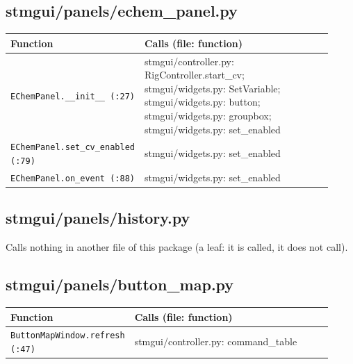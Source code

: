 \subsection{stmgui/panels/echem\_panel.py}

\small\setlength{\LTleft}{0pt}\setlength{\LTright}{\fill}
\begin{longtable}{@{}>{\raggedright\arraybackslash}p{0.280\linewidth}>{\raggedright\arraybackslash}p{0.640\linewidth}@{}}
\toprule
\textbf{Function} & \textbf{Calls (file: function)} \\
\midrule\endhead
\texttt{EChem\discretionary{}{}{}Panel.\discretionary{}{}{}\_\discretionary{}{}{}\_\discretionary{}{}{}init\_\discretionary{}{}{}\_\discretionary{}{}{} (:27)} & stmgui/controller.py: RigController.start\_cv; stmgui/widgets.py: SetVariable; stmgui/widgets.py: button; stmgui/widgets.py: groupbox; stmgui/widgets.py: set\_enabled \\
\texttt{EChem\discretionary{}{}{}Panel.\discretionary{}{}{}set\_\discretionary{}{}{}cv\_\discretionary{}{}{}enabled (:79)} & stmgui/widgets.py: set\_enabled \\
\texttt{EChem\discretionary{}{}{}Panel.\discretionary{}{}{}on\_\discretionary{}{}{}event (:88)} & stmgui/widgets.py: set\_enabled \\
\bottomrule
\end{longtable}
\normalsize

\subsection{stmgui/panels/history.py}

Calls nothing in another file of this package (a leaf: it is called, it does not call).

\subsection{stmgui/panels/button\_map.py}

\small\setlength{\LTleft}{0pt}\setlength{\LTright}{\fill}
\begin{longtable}{@{}>{\raggedright\arraybackslash}p{0.280\linewidth}>{\raggedright\arraybackslash}p{0.640\linewidth}@{}}
\toprule
\textbf{Function} & \textbf{Calls (file: function)} \\
\midrule\endhead
\texttt{Button\discretionary{}{}{}Map\discretionary{}{}{}Window.\discretionary{}{}{}refresh (:47)} & stmgui/controller.py: command\_table \\
\bottomrule
\end{longtable}
\normalsize

